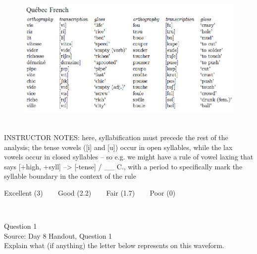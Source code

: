 \documentclass[12pt]{article}
\begin{document}
\begin{figure}[H]
\includegraphics{../images/quebecfrench.png}
\end{figure}

~\\
INSTRUCTOR NOTES: here, syllabification must precede the rest of the analysis; the tense vowels ([i] and [u]) occur in open syllables, while the lax vowels occur in closed syllables -- so e.g. we might have a rule of vowel laxing that says [+high, +syll] --> [-tense] / \_\_ C., with a period to specifically mark the syllable boundary in the context of the rule


\vfill
Excellent (3) ~~~ Good (2.2) ~~~ Fair (1.7) ~~~ Poor (0)
\newpage

\begin{center}
\textbf{{\color{red}{\HUGE END OF EXAM}}}\\

\end{center}
\newpage

\begin{center}
\textbf{{\color{blue}{\HUGE START OF EXAM\\}}}

\textbf{{\color{blue}{\HUGE Student ID: 3514\\}}}

\textbf{{\color{blue}{\HUGE 10:10 - 10:30 AM\\}}}

\end{center}
\newpage

{\large Question 1}\\

Source: Day 8 Handout, Question 1\\

Explain what (if anything) the letter below represents on this waveform.\\
\end{document}
